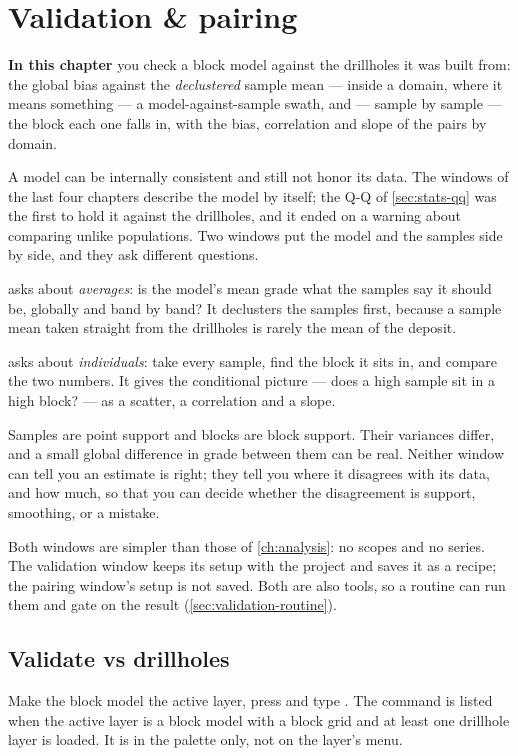 \chapter{Validation \& pairing}\label{ch:validation}
\begin{goals}
\textbf{In this chapter} you check a block model against the drillholes it was built from: the global bias against the \emph{declustered} sample mean — inside a domain, where it means something — a model-against-sample swath, and — sample by sample — the block each one falls in, with the bias, correlation and slope of the pairs by domain.
\end{goals}

A model can be internally consistent and still not honor its data. The windows of the last four chapters describe the model by itself; the Q-Q of \cref{sec:stats-qq} was the first to hold it against the drillholes, and it ended on a warning about comparing unlike populations. Two windows put the model and the samples side by side, and they ask different questions.

 asks about \emph{averages}: is the model's mean grade what the samples say it should be, globally and band by band? It declusters the samples first, because a sample mean taken straight from the drillholes is rarely the mean of the deposit.

 asks about \emph{individuals}: take every sample, find the block it sits in, and compare the two numbers. It gives the conditional picture — does a high sample sit in a high block? — as a scatter, a correlation and a slope.

\begin{note}
Samples are point support and blocks are block support. Their variances differ, and a small global difference in grade between them can be real. Neither window can tell you an estimate is right; they tell you where it disagrees with its data, and how much, so that you can decide whether the disagreement is support, smoothing, or a mistake.
\end{note}

Both windows are simpler than those of \cref{ch:analysis}: no scopes and no series. The validation window keeps its setup with the project and saves it as a recipe; the pairing window's setup is not saved. Both are also tools, so a routine can run them and gate on the result (\cref{sec:validation-routine}).

\section{Validate vs drillholes}\label{sec:validation-window}
Make the block model the active layer, press  and type . The command is listed when the active layer is a block model with a block grid and at least one drillhole layer is loaded. It is in the palette only, not on the layer's menu.

